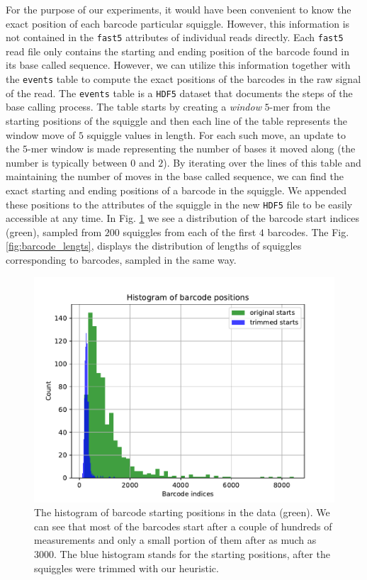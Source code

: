 For the purpose of our experiments, it would have been convenient to know the exact position of each barcode particular squiggle. However, this information is not contained in the \texttt{fast5} attributes of individual reads directly. Each \texttt{fast5} read file only contains the starting and ending position of the barcode found in its base called sequence. However, we can utilize this information together with the \texttt{events} table to compute the exact positions of the barcodes in the raw signal of the read. The \texttt{events} table is a \texttt{HDF5} dataset that documents the steps of the base calling process. The table starts by creating a \textit{window} $5$-mer from the starting positions of the squiggle and then each line of the table represents the window move of $5$ squiggle values in length. For each such move, an update to the $5$-mer window is made representing the number of bases it moved along (the number is typically between $0$ and $2$). By iterating over the lines of this table and maintaining the number of moves in the base called sequence, we can find the exact starting and ending positions of a barcode in the squiggle. We appended these positions to the attributes of the squiggle in the new \texttt{HDF5} file to be easily accessible at any time. In Fig. \ref{fig:barcode_pos} we see a distribution of the barcode start indices (green), sampled from $200$ squiggles from each of the first $4$ barcodes. The Fig. \ref{fig:barcode_lengts}, displays the distribution of lengths of squiggles corresponding to barcodes, sampled in the same way.

\begin{figure}[!ht]
    \centering
    \includegraphics[scale=0.8]{images/trim_hist.pdf}
    \caption[Barcode positions histogram]{The histogram of barcode starting positions in the data (green). We can see that most of the barcodes start after a couple of hundreds of measurements and only a small portion of them after as much as $3000$. The blue histogram stands for the starting positions, after the squiggles were trimmed with our heuristic.}
    \label{fig:barcode_pos}
\end{figure}


